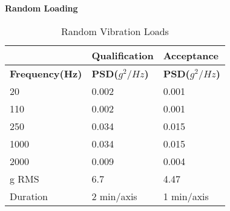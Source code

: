 \documentclass[../../main.tex]{subfiles}
\begin{document}
\textbf{Random Loading}

\begin{table}[H]
    \centering
    \begin{tabular}{ |p{3cm}|p{3cm}|p{3cm}| }
 \hline
    & \textbf{Qualification} & \textbf{Acceptance} \\
 \hline
\textbf{Frequency(Hz)} &  \textbf{PSD($g^2/Hz$)} &  \textbf{PSD($g^2/Hz$)} \\
\hline
20 & 0.002 & 0.001 \\
\hline
110 & 0.002 & 0.001 \\
\hline
250 & 0.034 & 0.015 \\
\hline
1000 & 0.034 & 0.015 \\
\hline
2000 & 0.009 & 0.004 \\
\hline
g RMS & 6.7 & 4.47 \\
\hline
Duration & 2 min/axis & 1 min/axis \\
\hline
 \end{tabular}
    \caption{Random Vibration Loads}
    \label{tab:my_label}
\end{table}
\end{document}
